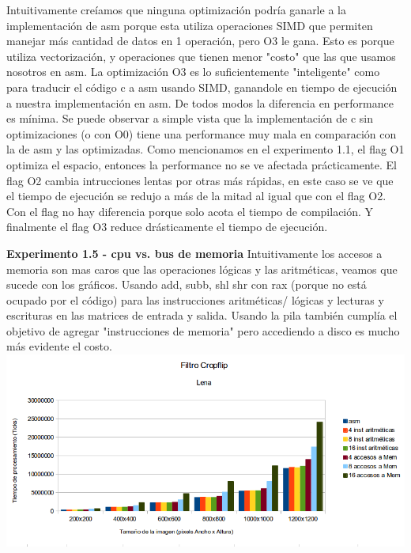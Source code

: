 \documentclass{article}
\begin{document}
Intuitivamente creíamos que ninguna optimización podría ganarle a la implementación de asm porque esta utiliza operaciones SIMD que permiten manejar más cantidad de datos en 1 operación, pero O3 le gana.
Esto es porque utiliza vectorización, y operaciones que tienen menor "costo" que las que usamos nosotros en asm.
La optimización O3 es lo suficientemente "inteligente" como para traducir el código c a asm usando SIMD, ganandole en tiempo de ejecución a nuestra implementación en asm.\newline
De todos modos la diferencia en performance es mínima. \newline
Se puede observar a simple vista que la implementación de c sin optimizaciones (o con O0) tiene una performance muy mala en comparación con la de asm y las optimizadas.
Como mencionamos en el experimento 1.1, el flag O1 optimiza el espacio, entonces la performance no se ve afectada prácticamente.
El flag O2 cambia intrucciones lentas por otras más rápidas, en este caso se ve que el tiempo de ejecución se redujo a más de la mitad al igual que con el flag O2.
Con el flag no hay diferencia porque solo acota el tiempo de compilación.
Y finalmente el flag O3 reduce drásticamente el tiempo de ejecución. 
\newline

\textbf{Experimento 1.5 - cpu vs. bus de memoria}\newline
Intuitivamente los accesos a memoria son mas caros que las operaciones lógicas y las aritméticas, veamos que sucede con los gráficos.
\newline
Usando add, subb, shl shr con rax (porque no está ocupado por el código) para las instrucciones aritméticas/ lógicas
y lecturas y escrituras en las matrices de entrada y salida.\newline
Usando la pila también cumplía el objetivo de agregar "instrucciones de memoria" pero accediendo a disco es mucho más evidente el costo.\newline
\includegraphics[width=\textwidth,height=\textheight,keepaspectratio
]{graficoMenVsArit.png}
\begin {flushleft}
\end{flushleft}
\end{document}
